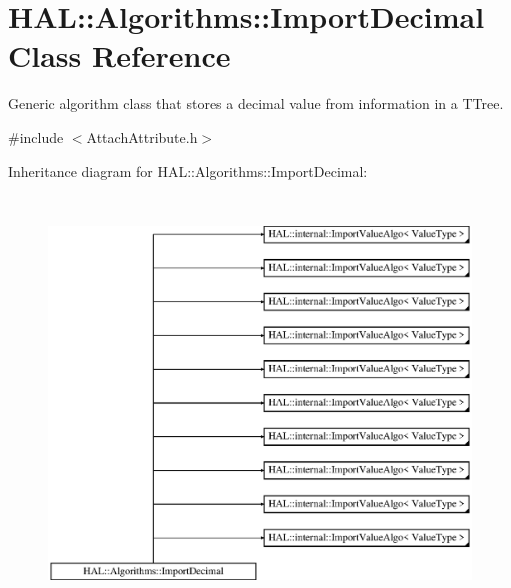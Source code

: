 \hypertarget{class_h_a_l_1_1_algorithms_1_1_import_decimal}{\section{H\+A\+L\+:\+:Algorithms\+:\+:Import\+Decimal Class Reference}
\label{class_h_a_l_1_1_algorithms_1_1_import_decimal}
}


Generic algorithm class that stores a decimal value from information in a T\+Tree.  




{\ttfamily \#include $<$Attach\+Attribute.\+h$>$}

Inheritance diagram for H\+A\+L\+:\+:Algorithms\+:\+:Import\+Decimal\+:\begin{figure}[H]
\begin{center}
\leavevmode
\includegraphics[height=11.000000cm]{class_h_a_l_1_1_algorithms_1_1_import_decimal}
\end{center}
\end{figure}
